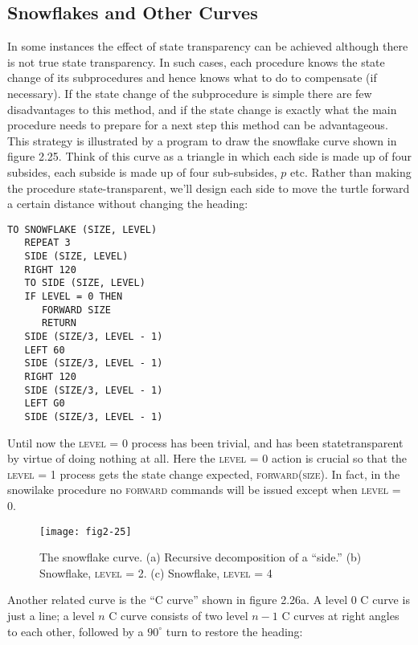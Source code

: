 \documentclass{book}
\begin{document}
\subsection{Snowflakes and Other Curves}

In some instances the effect of state transparency can be achieved although there is not true state transparency. In such cases, each procedure knows the state change of its subprocedures and hence knows
what to do to compensate (if necessary). If the state change of the subprocedure is simple there are few disadvantages to this method, and if
the state change is exactly what the main procedure needs to prepare
for a next step this method can be advantageous.
This strategy is illustrated by a program to draw the snowflake curve
shown in figure 2.25. Think of this curve as a triangle in which each side
is made up of four subsides, each subside is made up of four sub-subsides,
$p$ etc. Rather than making the procedure state-transparent, we'll design
each side to move the turtle forward a certain distance without changing
the heading:

\begin{verbatim}
TO SNOWFLAKE (SIZE, LEVEL)
   REPEAT 3
   SIDE (SIZE, LEVEL)
   RIGHT 120
   TO SIDE (SIZE, LEVEL)
   IF LEVEL = 0 THEN
      FORWARD SIZE
      RETURN
   SIDE (SIZE/3, LEVEL - 1)
   LEFT 60
   SIDE (SIZE/3, LEVEL - 1)
   RIGHT 120
   SIDE (SIZE/3, LEVEL - 1)
   LEFT G0
   SIDE (SIZE/3, LEVEL - 1)
\end{verbatim}
Until now the \textsc{level} = 0 process has been trivial, and has been statetransparent by virtue of doing nothing at all. Here the \textsc{level} = 0 action
is crucial so that the \textsc{level} = 1 process gets the state change expected,
\textsc{forward(size)}. In fact, in the snowilake procedure no \textsc{forward} commands will be issued except when \textsc{level} = 0.

\begin{figure}
\begin{center}
\texttt{[image: fig2-25]}
\caption{The snowflake curve. (a) Recursive decomposition of a ``side.'' (b) Snowflake, \textsc{level} = 2. (c) Snowflake, \textsc{level} = 4}
\end{center}
\end{figure}


Another related curve is the ``C curve'' shown in figure 2.26a. A level
0 C curve is just a line; a level $n$ C curve consists of two level $n - 1$ C
curves at right angles to each other, followed by a $90^{\circ}$ turn to restore
the heading:
\end{document}

